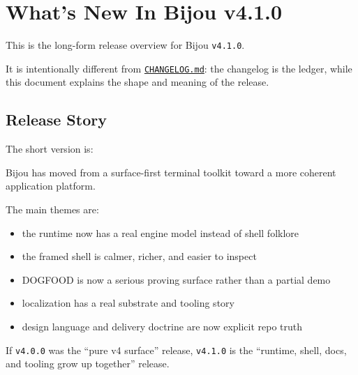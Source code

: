 \chapter{What's New In Bijou v4.1.0}\label{record-275}

\smallskip

This is the long-form release overview for Bijou \texttt{v\allowbreak{}4\allowbreak{}.\allowbreak{}1\allowbreak{}.\allowbreak{}0}.

It is intentionally different from \href{https://github.com/flyingrobots/bijou/blob/cbd70612140e7a450d764b3c7be1c6af878b99bc/docs/CHANGELOG.md}{\texttt{C\allowbreak{}H\allowbreak{}A\allowbreak{}N\allowbreak{}G\allowbreak{}E\allowbreak{}L\allowbreak{}O\allowbreak{}G\allowbreak{}.\allowbreak{}m\allowbreak{}d}}: the changelog is the ledger, while this document explains the shape and meaning of the release.

\section{Release Story}\label{record-275-release-story}

The short version is:

Bijou has moved from a surface-first terminal toolkit toward a more coherent application platform.

The main themes are:

\begin{itemize}
\tightlist
\item
  the runtime now has a real engine model instead of shell folklore
\item
  the framed shell is calmer, richer, and easier to inspect
\item
  DOGFOOD is now a serious proving surface rather than a partial demo
\item
  localization has a real substrate and tooling story
\item
  design language and delivery doctrine are now explicit repo truth
\end{itemize}

If \texttt{v\allowbreak{}4\allowbreak{}.\allowbreak{}0\allowbreak{}.\allowbreak{}0} was the ``pure v4 surface'' release, \texttt{v\allowbreak{}4\allowbreak{}.\allowbreak{}1\allowbreak{}.\allowbreak{}0} is the ``runtime, shell, docs, and tooling grow up together'' release.

